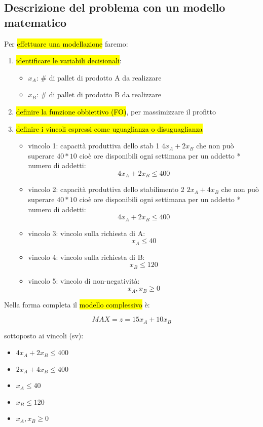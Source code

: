 \subsection{Descrizione del problema con un modello matematico}

Per \hl{effettuare una modellazione} faremo:

\begin{enumerate}
	\item \hl{identificare le variabili decisionali}:
		\begin{itemize}
			\item $x_A$: \# di pallet di prodotto A da realizzare
			\item $x_B$: \# di pallet di prodotto B da realizzare
		\end{itemize}
		
	\item \hl{definire la funzione obbiettivo (FO)}, per massimizzare il profitto

	\item \hl{definire i vincoli espressi come uguaglianza o disuguaglianza}
		\begin{itemize}
			\item vincolo 1: capacità produttiva dello stab 1 $4x_A+2x_B$ che non può superare $40*10$ cioè ore disponibili ogni settimana per un addetto * numero di addetti: $$4x_A+2x_B \leq 400$$
			\item vincolo 2: capacità produttiva dello stabilimento 2 $2x_A+4x_B$ che non può superare $40*10$ cioè ore disponibili ogni settimana per un addetto * numero di addetti: $$4x_A+2x_B \leq 400$$
			\item vincolo 3: vincolo sulla richiesta di A: $$x_A \leq 40$$
			\item vincolo 4: vincolo sulla richiesta di B: $$x_B \leq 120$$
			\item vincolo 5: vincolo di non-negatività: $$x_A, x_B \geq 0$$
		\end{itemize}
		
	
\end{enumerate}

	
	
Nella forma completa il \hl{modello complessivo} è:

$$MAX=z=15x_A+10x_B$$

sottoposto ai vincoli (sv):

\begin{itemize}
	\item $4x_A+2x_B \leq 400$
	\item $2x_A+4x_B \leq 400$
	\item $x_A \leq 40$
	\item $x_B \leq 120$
	\item $x_A, x_B \geq 0$
\end{itemize}


